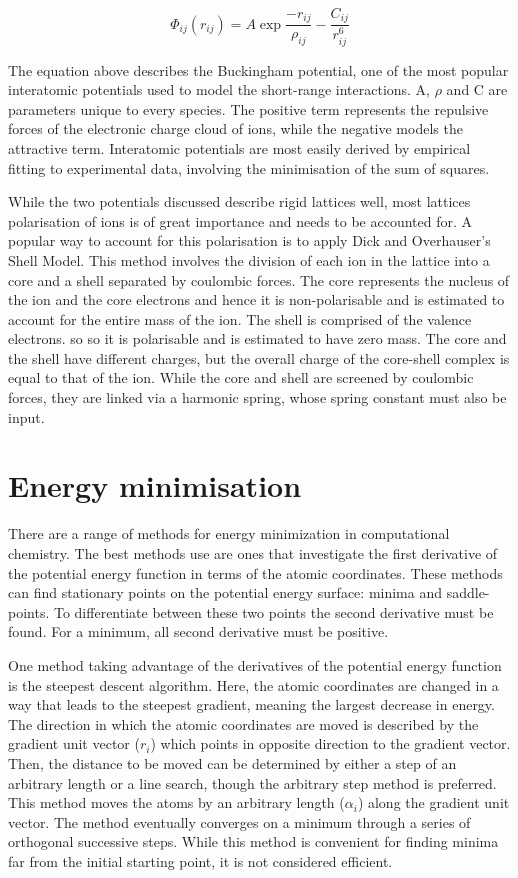 \documentclass[10pt,a4paper, titlepage]{article}
\begin{document}
$$ \Phi_{ij}(r_{ij}) = A\exp\frac{-r_{ij}}{\rho_{ij}} - \frac{C_{ij}}{r_{ij}^6} $$

The equation above describes the Buckingham potential, one of the most popular interatomic potentials used to model the short-range interactions. 
A, $ \rho $ and C are parameters unique to every species. 
The positive term represents the repulsive forces of the electronic charge cloud of ions, while the negative models the attractive term. 
Interatomic potentials are most easily derived by empirical fitting to experimental data, involving the minimisation of the sum of squares.  

While the two potentials discussed describe rigid lattices well, most lattices polarisation of ions is of great importance and needs to be accounted for. 
A popular way to account for this polarisation is to apply Dick and Overhauser’s Shell Model. \cite{RN75} 
This method involves the division of each ion in the lattice into a core and a shell separated by coulombic forces. 
The core represents the nucleus of the ion and the core electrons and hence it is non-polarisable and is estimated to account for the entire mass of the ion. 
The shell is comprised of the valence electrons. so so it is polarisable and is estimated to have zero mass. 
The core and the shell have different charges, but the overall charge of the core-shell complex is equal to that of the ion. 
While the core and shell are screened by coulombic forces, they are linked via a harmonic spring, whose spring constant must also be input. 

\section{Energy minimisation}

There are a range of methods for energy minimization in computational chemistry. 
The best methods use are ones that investigate the first derivative of the potential energy function in terms of the atomic coordinates. 
These methods can find stationary points on the potential energy surface: minima and saddle-points. 
To differentiate between these two points the second derivative must be found. 
For a minimum, all second derivative must be positive.  

One method taking advantage of the derivatives of the potential energy function is the steepest descent algorithm. 
Here, the atomic coordinates are changed in a way that leads to the steepest gradient, meaning the largest decrease in energy. 
The direction in which the atomic coordinates are moved is described by the gradient unit vector ($r_i$) which points in opposite direction to the gradient vector. 
Then, the distance to be moved can be determined by either a step of an arbitrary length or a line search, though the arbitrary step method is preferred. 
This method moves the atoms by an arbitrary length ($ \alpha_i $) along the gradient unit vector. 
The method eventually converges on a minimum through a series of orthogonal successive steps. 
While this method is convenient for finding minima far from the initial starting point, it is not considered efficient. 
\end{document}

